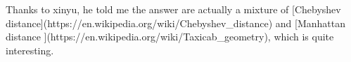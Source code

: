 \documentclass[12pt]{article}
\begin{document}
\begin{center}
\end{center}

Thanks to xinyu, he told me the answer are actually a mixture of [Chebyshev distance](https://en.wikipedia.org/wiki/Chebyshev_distance) and [Manhattan distance
](https://en.wikipedia.org/wiki/Taxicab_geometry), which is quite interesting.
\end{document}

